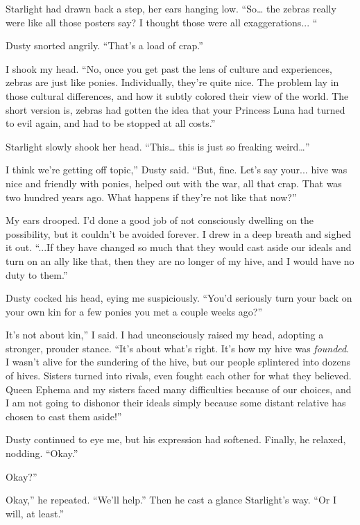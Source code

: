 Starlight had drawn back a step, her ears hanging low. “So… the zebras really were like all those posters say? I thought those were all exaggerations... “

Dusty snorted angrily. “That’s a load of crap.”

I shook my head. “No, once you get past the lens of culture and experiences, zebras are just like ponies. Individually, they’re quite nice. The problem lay in those cultural differences, and how it subtly colored their view of the world. The short version is, zebras had gotten the idea that your Princess Luna had turned to evil again, and had to be stopped at all costs.”

Starlight slowly shook her head. “This… this is just so freaking weird…”

\leavevmode{}I think we’re getting off topic,” Dusty said. “But, fine. Let’s say your... hive was nice and friendly with ponies, helped out with the war, all that crap. That was two hundred years ago. What happens if they’re not like that now?”

My ears drooped. I’d done a good job of not consciously dwelling on the possibility, but it couldn’t be avoided forever. I drew in a deep breath and sighed it out. “...If they have changed so much that they would cast aside our ideals and turn on an ally like that, then they are no longer of my hive, and I would have no duty to them.”

Dusty cocked his head, eying me suspiciously. “You’d seriously turn your back on your own kin for a few ponies you met a couple weeks ago?”

\leavevmode{}It’s not about kin,” I said. I had unconsciously raised my head, adopting a stronger, prouder stance. “It’s about what’s right. It’s how my hive was \textit{founded}. I wasn’t alive for the sundering of the hive, but our people splintered into dozens of hives. Sisters turned into rivals, even fought each other for what they believed. Queen Ephema and my sisters faced many difficulties because of our choices, and I am not going to dishonor their ideals simply because some distant relative has chosen to cast them aside!”

Dusty continued to eye me, but his expression had softened. Finally, he relaxed, nodding. “Okay.”

\leavevmode{}Okay?”

\leavevmode{}Okay,” he repeated. “We’ll help.” Then he cast a glance Starlight’s way. “Or I will, at least.”


